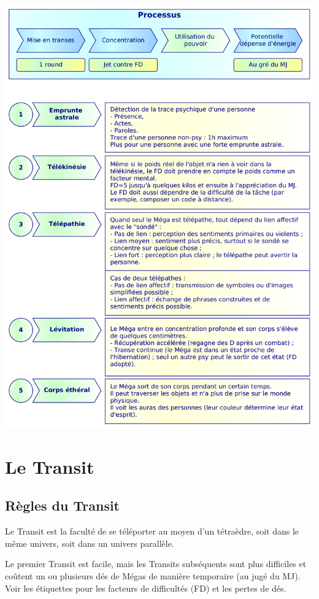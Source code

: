 \documentclass[11pt]{article}
\begin{document}
\begin{center}
\includegraphics[scale=0.28]{03-pouvoirs-psy}
\end{center}

\newpage
\section{Le Transit}

\subsection{Règles du Transit}

Le Transit est la faculté de se téléporter au moyen d'un tétraèdre, soit dans le même univers, soit dans un univers parallèle.

Le premier Transit est facile, mais les Transits subséquents sont plus difficiles et coûtent un ou plusieurs dés de Mégas de manière temporaire (au jugé du MJ). Voir les étiquettes pour les facteurs de difficultés (FD) et les pertes de dés.
\end{document}
